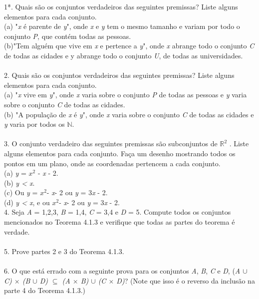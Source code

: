    1*.      Quais são os conjuntos verdadeiros das seguintes premissas? Liste alguns elementos para cada conjunto.
  \\
  (a) "\textit{x} é parente de \textit{y}", onde \textit{x} e \textit{y} tem o mesmo tamanho e variam por todo o conjunto \textit{P}, que contém todas as pessoas.
  \\
  (b)"Tem alguém que vive em \textit{x} e pertence a \textit{y}", onde \textit{x} abrange todo o conjunto \textit{C} de todas as cidades e y abrange todo o conjunto \textit{U}, de todas as universidades.
  \\
  \\
2.     Quais são os conjuntos verdadeiros das seguintes premissas? Liste alguns elementos para cada conjunto.
\\
(a) "\textit{x} vive em \textit{y}", onde \textit{x} varia sobre o conjunto \textit{P} de todas as pessoas e \textit{y} varia sobre o conjunto \textit{C} de todas as cidades.
\\
(b) "A população de \textit{x} é \textit{y}", onde \textit{x} varia sobre o conjunto \textit{C} de todas as cidades  e \textit{y} varia por todos os $\mathbb{N}$.
\\
\\
3.      O conjunto verdadeiro das seguintes premissas são subconjuntos de $\mathbb{R}^2$ . Liste alguns elementos para cada conjunto. Faça um desenho mostrando todos os pontos em um plano, onde as coordenadas pertencem a cada conjunto. 
\\
(a) \textit{y} =  $\textit{x}{^2}$ - \textit{x} - 2. 
\\
(b) \textit{y < x}.
\\
(c) Ou \textit{y} =  $\textit{x}{^2}$- \textit{x}- 2 ou \textit{y} = 3\textit{x} - 2.
\\
(d) \textit{y < x}, e ou  $\textit{x}{^2}$- \textit{x}- 2 ou \textit{y} = 3\textit{x} - 2.
\\
4.    Seja \textit{A} = {1,2,3}, \textit{B} = {1,4}, \textit{C} = {3,4} e \textit{D} = {5}. Compute todos os conjuntos mencionados no Teorema 4.1.3 e verifique que todas as partes do teorema é verdade.
\\
\\
5. Prove partes 2 e 3 do Teorema 4.1.3.
\\
\\
6. O que está errado com a seguinte prova para os conjuntos \textit{A}, \textit{B}, \textit{C} e \textit{D}, (\textit{A $\cup$ C) $\times$ (B $\cup$ D) $\subseteq$ (A $\times$ B) $\cup$ (C $\times$ D)}? (Note que isso é o reverso da inclusão na parte 4 do Teorema 4.1.3.)
